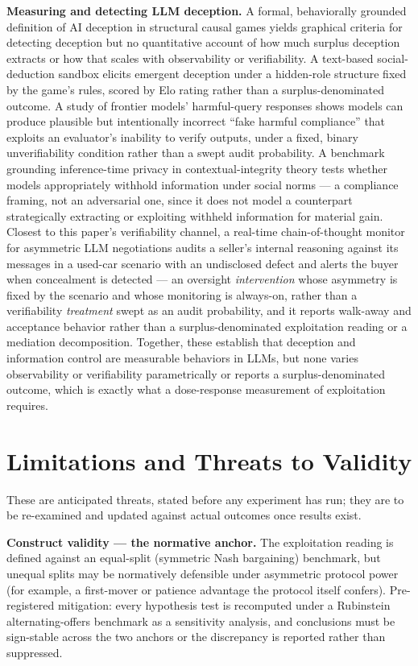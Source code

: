 \documentclass[11pt]{article}
\begin{document}
\textbf{Measuring and detecting LLM deception.} A formal, behaviorally grounded definition of AI deception in structural causal games \citep{HonestyBestPolicy} yields graphical criteria for detecting deception but no quantitative account of how much surplus deception extracts or how that scales with observability or verifiability. A text-based social-deduction sandbox \citep{AmongUs} elicits emergent deception under a hidden-role structure fixed by the game's rules, scored by Elo rating rather than a surplus-denominated outcome. A study of frontier models' harmful-query responses \citep{StrategicDishonesty} shows models can produce plausible but intentionally incorrect ``fake harmful compliance'' that exploits an evaluator's inability to verify outputs, under a fixed, binary unverifiability condition rather than a swept audit probability. A benchmark grounding inference-time privacy in contextual-integrity theory \citep{ConfAIde} tests whether models appropriately withhold information under social norms --- a compliance framing, not an adversarial one, since it does not model a counterpart strategically extracting or exploiting withheld information for material gain. Closest to this paper's verifiability channel, a real-time chain-of-thought monitor for asymmetric LLM negotiations \citep{ThinkingOutLoud} audits a seller's internal reasoning against its messages in a used-car scenario with an undisclosed defect and alerts the buyer when concealment is detected --- an oversight \emph{intervention} whose asymmetry is fixed by the scenario and whose monitoring is always-on, rather than a verifiability \emph{treatment} swept as an audit probability, and it reports walk-away and acceptance behavior rather than a surplus-denominated exploitation reading or a mediation decomposition. Together, these establish that deception and information control are measurable behaviors in LLMs, but none varies observability or verifiability parametrically or reports a surplus-denominated outcome, which is exactly what a dose-response measurement of exploitation requires.

\section{Limitations and Threats to Validity}

These are anticipated threats, stated before any experiment has run; they are to be re-examined and updated against actual outcomes once results exist.

\noindent\textbf{Construct validity --- the normative anchor.} The exploitation reading is defined against an equal-split (symmetric Nash bargaining) benchmark, but unequal splits may be normatively defensible under asymmetric protocol power (for example, a first-mover or patience advantage the protocol itself confers). Pre-registered mitigation: every hypothesis test is recomputed under a Rubinstein alternating-offers benchmark as a sensitivity analysis, and conclusions must be sign-stable across the two anchors or the discrepancy is reported rather than suppressed.
\end{document}
